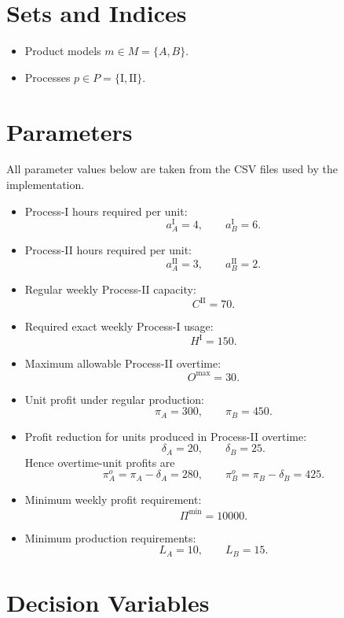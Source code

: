 \section*{Sets and Indices}

\begin{itemize}
    \item Product models $m \in M = \{A,B\}$.
    \item Processes $p \in P = \{\mathrm{I},\mathrm{II}\}$.
\end{itemize}

\section*{Parameters}

All parameter values below are taken from the CSV files used by the implementation.

\begin{itemize}
    \item Process-I hours required per unit:
    \[
    a^{\mathrm{I}}_A = 4, \qquad a^{\mathrm{I}}_B = 6.
    \]
    \item Process-II hours required per unit:
    \[
    a^{\mathrm{II}}_A = 3, \qquad a^{\mathrm{II}}_B = 2.
    \]
    \item Regular weekly Process-II capacity:
    \[
    C^{\mathrm{II}} = 70.
    \]
    \item Required exact weekly Process-I usage:
    \[
    H^{\mathrm{I}} = 150.
    \]
    \item Maximum allowable Process-II overtime:
    \[
    O^{\max} = 30.
    \]
    \item Unit profit under regular production:
    \[
    \pi_A = 300, \qquad \pi_B = 450.
    \]
    \item Profit reduction for units produced in Process-II overtime:
    \[
    \delta_A = 20, \qquad \delta_B = 25.
    \]
    Hence overtime-unit profits are
    \[
    \pi^{o}_A = \pi_A - \delta_A = 280, \qquad
    \pi^{o}_B = \pi_B - \delta_B = 425.
    \]
    \item Minimum weekly profit requirement:
    \[
    \Pi^{\min} = 10000.
    \]
    \item Minimum production requirements:
    \[
    L_A = 10, \qquad L_B = 15.
    \]
\end{itemize}

\section*{Decision Variables}

